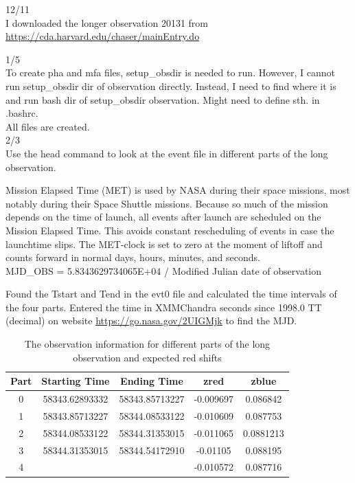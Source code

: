 12/11\\
I downloaded the longer observation 20131 from \url{https://cda.harvard.edu/chaser/mainEntry.do}

1/5\\
To create pha and mfa files, setup\_obsdir is needed to run. However, I cannot run setup\_obsdir {dir of observation} directly. Instead, I need to find where it is and run bash {dir of setup\_obsdir} observation. Might need to define sth. in .bashrc. \\
All files are created.\\



2/3\\
Use the head command to look at the event file in different parts of the long observation.\par

Mission Elapsed Time (MET) is used by NASA during their space missions, most notably during their Space Shuttle missions. Because so much of the mission depends on the time of launch, all events after launch are scheduled on the Mission Elapsed Time. This avoids constant rescheduling of events in case the launchtime slips. The MET-clock is set to zero at the moment of liftoff and counts forward in normal days, hours, minutes, and seconds.\\
MJD\_OBS =  5.8343629734065E+04 / Modified Julian date of observation \par
Found the Tstart and Tend in the evt0 file and calculated the time intervals of the four parts. Entered the time in XMM\/Chandra seconds since 1998.0 TT (decimal) on website \url{https://go.nasa.gov/2UIGMjk} to find the MJD.

\begin{table}[t]
\caption{The observation information for different parts of the long observation and expected red shifts}
\centering 
\begin{tabular}{c c c c c}
\hline
\hline                       
Part & Starting Time & Ending Time & zred & zblue\\ [0.5ex]
\hline
0 & 58343.62893332 & 58343.85713227 & -0.009697 & 0.086842\\
1 & 58343.85713227 & 58344.08533122& -0.010609 & 0.087753\\
2 & 58344.08533122 & 58344.31353015 & -0.011065 & 0.0881213 \\
3 & 58344.31353015 & 58344.54172910 & -0.01105 & 0.088195\\
4 &  &  & -0.010572 & 0.087716\\
[1ex]
\hline
\end{tabular}
\label{table:nonlin}
\end{table}\par


